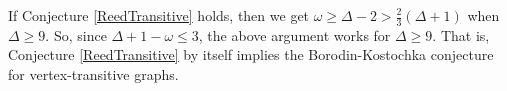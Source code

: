 \documentclass[12pt]{article}
\theoremstyle{plain}
\theoremstyle{definition}
\theoremstyle{remark}
\begin{document}
If Conjecture \ref{ReedTransitive} holds, then we get $\omega \ge \Delta - 2 > \frac23 (\Delta + 1)$ when $\Delta \ge 9$.  So, since $\Delta + 1 - \omega \le 3$, the above argument works for $\Delta \ge 9$.  That is, Conjecture \ref{ReedTransitive} by itself implies the Borodin-Kostochka conjecture for vertex-transitive graphs.



\end{document}
